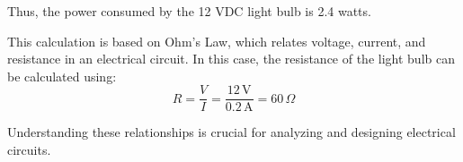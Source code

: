 Thus, the power consumed by the 12 VDC light bulb is 2.4 watts.

This calculation is based on Ohm's Law, which relates voltage, current, and resistance in an electrical circuit. In this case, the resistance of the light bulb can be calculated using:
\[
R = \frac{V}{I} = \frac{12 \, \text{V}}{0.2 \, \text{A}} = 60 \, \Omega
\]

Understanding these relationships is crucial for analyzing and designing electrical circuits.

